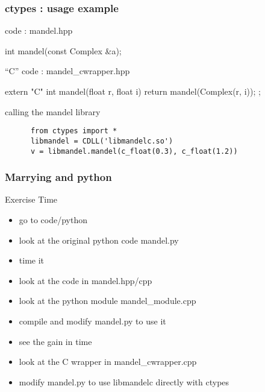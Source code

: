 \begin{frame}[fragile]
  \frametitle{ctypes : usage example}
  \begin{block}{\cpp code : mandel.hpp}
    \begin{cppcode*}{}
      int mandel(const Complex &a);
    \end{cppcode*}
  \end{block}
  \begin{block}{``C'' code : mandel\_cwrapper.hpp}
    \begin{cppcode*}{}
      extern "C" {
        int mandel(float r, float i) {
          return mandel(Complex(r, i));
        };
      }
    \end{cppcode*}
  \end{block}
  \begin{exampleblock}{calling the mandel library}
    \begin{verbatim}
      from ctypes import *
      libmandel = CDLL('libmandelc.so')
      v = libmandel.mandel(c_float(0.3), c_float(1.2))
    \end{verbatim}
  \end{exampleblock}
\end{frame}

\begin{frame}[fragile]
  \frametitle{Marrying \cpp and python}
  \begin{alertblock}{Exercise Time}
    \begin{itemize}
    \item go to code/python
    \item look at the original python code mandel.py
    \item time it
    \item look at the code in mandel.hpp/cpp
    \item look at the python module mandel\_module.cpp
    \item compile and modify mandel.py to use it
    \item see the gain in time
    \item look at the C wrapper in mandel\_cwrapper.cpp
    \item modify mandel.py to use libmandelc directly with ctypes
    \end{itemize}
  \end{alertblock}
\end{frame}
